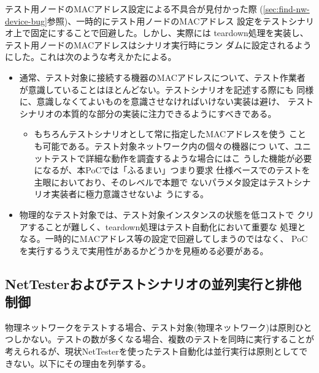 テスト用ノードのMACアドレス設定による不具合が見付かった際
(\ref{sec:find-nw-device-bug}参照)、一時的にテスト用ノードのMACアドレス
設定をテストシナリオ上で固定にすることで回避した。しかし、実際には
teardown処理を実装し、テスト用ノードのMACアドレスはシナリオ実行時にラン
ダムに設定されるようにした。これは次のような考えかたによる。
\begin{itemize}
 \item 通常、テスト対象に接続する機器のMACアドレスについて、テスト作業者
       が意識していることはほとんどない。テストシナリオを記述する際にも
       同様に、意識しなくてよいものを意識させなければいけない実装は避け、
       テストシナリオの本質的な部分の実装に注力できるようにすべきである。
       \begin{itemize}
        \item もちろんテストシナリオとして常に指定したMACアドレスを使う
              ことも可能である。テスト対象ネットワーク内の個々の機器につ
              いて、ユニットテストで詳細な動作を調査するような場合にはこ
              うした機能が必要になるが、本PoCでは「ふるまい」つまり要求
              仕様ベースでのテストを主眼においており、そのレベルで本題で
              ないパラメタ設定はテストシナリオ実装者に極力意識させないよ
              うにする。
       \end{itemize}
 \item 物理的なテスト対象では、テスト対象インスタンスの状態を低コストで
       クリアすることが難しく、teardown処理はテスト自動化において重要な
       処理となる。一時的にMACアドレス等の設定で回避してしまうのではなく、
       PoCを実行するうえで実用性があるかどうかを見極める必要がある。
\end{itemize}

  \subsection{NetTesterおよびテストシナリオの並列実行と排他制御}
  \label{sec:testscenario-excl-ctrl}

物理ネットワークをテストする場合、テスト対象(物理ネットワーク)は原則ひと
つしかない。テストの数が多くなる場合、複数のテストを同時に実行することが
考えられるが、現状NetTesterを使ったテスト自動化は並行実行は原則としてで
きない。以下にその理由を列挙する。

